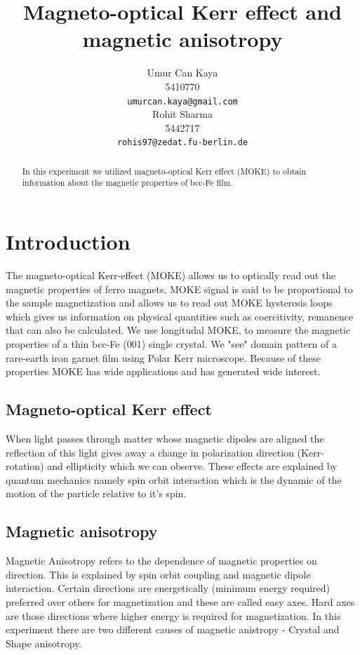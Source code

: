 \documentclass{article}
\title{Magneto-optical Kerr effect and magnetic anisotropy}
\author{
Umur Can Kaya\\
5410770\\
\texttt{umurcan.kaya@gmail.com}\\
\And
Rohit Sharma\\
5442717\\
\texttt{rohis97@zedat.fu-berlin.de}\\
}
\begin{document}
\maketitle

\begin{abstract}
In this experiment we utilized magneto-optical Kerr effect (MOKE) to obtain information about the magnetic properties of bcc-Fe film. 
\end{abstract}

\section{Introduction}
The magneto-optical Kerr-effect (MOKE) allows us to optically read out the magnetic properties of ferro magnets. MOKE signal is said to be proportional to the sample magnetization and allows us to read out MOKE hysteresis loops which gives us information on physical quantities such as coercitivity, remanence that can also be calculated. We use longitudal MOKE, to measure the magnetic properties of a thin bcc-Fe (001) single crystal. We "see"  domain pattern of a rare-earth iron garnet film using Polar Kerr microscope. Because of these properties MOKE has wide applications and has generated wide interest. 
\subsection{Magneto-optical Kerr effect}
When light passes through  matter whose  magnetic dipoles are aligned the reflection of this light gives away a change in polarization direction (Kerr-rotation) and  ellipticity which we can observe. These effects are explained by quantum mechanics namely spin orbit interaction which is the dynamic of the motion of the particle relative to it's spin.

\subsection{Magnetic anisotropy}
Magnetic Anisotropy refers to the dependence of  magnetic properties on direction. This is explained by spin orbit coupling and magnetic dipole interaction. Certain directions are energetically (minimum energy required) preferred over others for magnetization and these are called easy axes. Hard axes are those directions where  higher energy is required for magnetization. In this experiment there are two different causes of magnetic anistropy - Crystal and Shape anisotropy.
\end{document}
